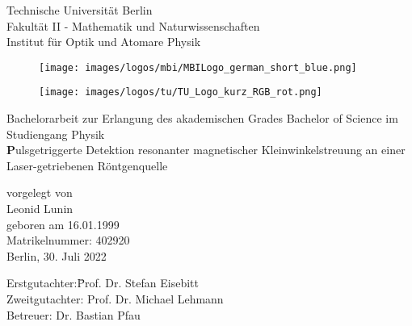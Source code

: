 \begin{titlepage}	
\noindent
\begin{minipage}{0.5\textwidth}
{\small
Technische Universit\"at Berlin\\
Fakult\"at II - Mathematik und Naturwissenschaften\\
Institut für Optik und Atomare Physik\\
}%
\end{minipage}%
\hfill
\begin{minipage}{0.18\textwidth}
\begin{figure}[H]%
\texttt{[image: images/logos/mbi/MBILogo\_german\_short\_blue.png]}
\end{figure}
\end{minipage}%
\hspace{5mm}
\begin{minipage}{0.18\textwidth}
\begin{figure}[H]%
\texttt{[image: images/logos/tu/TU\_Logo\_kurz\_RGB\_rot.png]}
\end{figure}
\end{minipage}%

\vspace{2cm}

\thispagestyle{empty}
\begin{center}

{\large Bachelorarbeit zur Erlangung des akademischen Grades
Bachelor of Science
im Studiengang Physik}\\
\vspace{1cm}
{\huge\textbf
Pulsgetriggerte Detektion resonanter magnetischer Kleinwinkelstreuung an einer Laser-getriebenen Röntgenquelle}
\vspace{1.2cm}

{\large vorgelegt von\\
	 Leonid Lunin \\
	 geboren am 16.01.1999\\
	 Matrikelnummer: 402920\\[2cm]
	 Berlin, 30. Juli 2022\\[2cm]
}

\begin{minipage}{\linewidth} 
\begin{tabbing}
  		Erstgutachter:\quad \= Prof. Dr. Stefan Eisebitt\\[0.3cm]
  		Zweitgutachter: \> Prof. Dr. Michael Lehmann\\[0.3cm]
    	Betreuer:             \> Dr. Bastian Pfau \\
    						         
\end{tabbing}
\end{minipage}

\vspace{1.5cm}

\end{center}
\thispagestyle{empty}
\newpage
\setcounter{page}{1}
\end{titlepage}

\shipout\null
